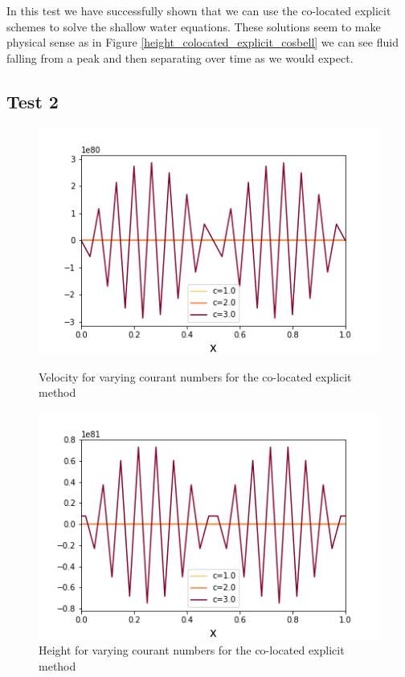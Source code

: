\documentclass[a4paper,12pt, notitlepage]{article}
\begin{document}
In this test we have successfully shown that we can use the co-located explicit schemes to solve the shallow water equations. These solutions seem to make physical sense as in Figure \ref{height_colocated_explicit_cosbell} we can see fluid falling from a peak and then separating over time as we would expect.

\subsection{Test 2}\label{sectiontest2}

\begin{figure} [H]
	\begin{minipage}{.5\textwidth}
		\ContinuedFloat*
		\captionsetup{width=0.9\textwidth}
		\captionsetup{justification=centering}
		\includegraphics[width=\textwidth]{velocity_varying_courant_explicit.png}
		\caption{\label{velocity_varying_courant_explicit} Velocity for varying courant numbers for the co-located explicit method} 
	\end{minipage}
	\begin{minipage}{.5\textwidth}
		\ContinuedFloat
		\captionsetup{width=0.9\textwidth}
		\captionsetup{justification=centering}
		\includegraphics[width=\textwidth]{height_varying_courant_explicit.png}
		\caption{\label{height_varying_courant_explicit} Height for varying courant numbers for the co-located explicit method} 
	\end{minipage}
\end{figure}
\end{document}
